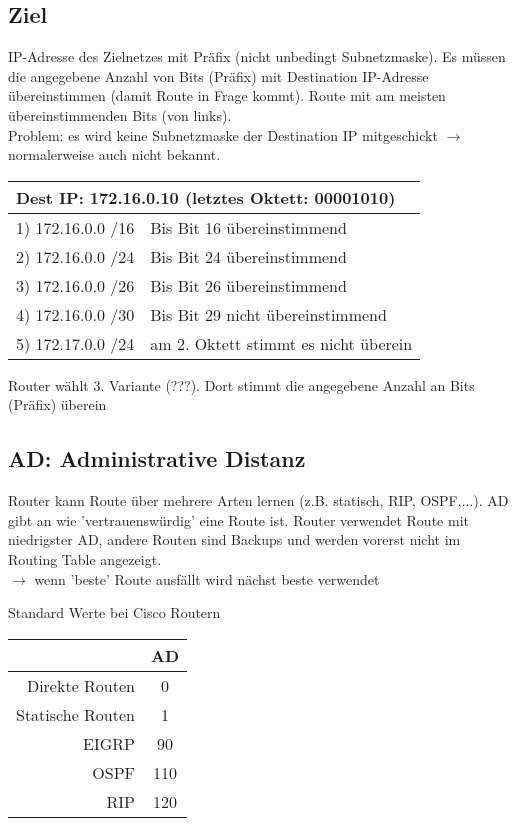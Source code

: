 \subsection*{Ziel}
IP-Adresse des Zielnetzes mit Präfix (nicht unbedingt Subnetzmaske). Es müssen die angegebene Anzahl von Bits (Präfix) mit Destination IP-Adresse übereinstimmen (damit Route in Frage kommt). Route mit am meisten übereinstimmenden Bits (von links). \\
Problem: es wird keine Subnetzmaske der Destination IP mitgeschickt $\rightarrow$ normalerweise auch nicht bekannt.

\begin{center}
\begin{tabular}{ll}
	\multicolumn{2}{l}{Dest IP: 172.16.0.10 (letztes Oktett: 00001010)} \\
	\hline
	1) 172.16.0.0 /16 & Bis Bit 16 übereinstimmend \\
	2) 172.16.0.0 /24 & Bis Bit 24 übereinstimmend \\
	3) 172.16.0.0 /26 & Bis Bit 26 übereinstimmend \\
	4) 172.16.0.0 /30 & Bis Bit 29 nicht übereinstimmend \\
	5) 172.17.0.0 /24 & am 2. Oktett stimmt es nicht überein
\end{tabular}
\end{center}

Router wählt 3. Variante (???). Dort stimmt die angegebene Anzahl an Bits (Präfix) überein

\subsection*{AD: Administrative Distanz}
Router kann Route über mehrere Arten lernen (z.B. statisch, RIP, OSPF,...). AD gibt an wie 'vertrauenswürdig' eine Route ist. Router verwendet Route mit niedrigster AD, andere Routen sind Backups und werden vorerst nicht im Routing Table angezeigt.\\
$\rightarrow$ wenn 'beste' Route ausfällt wird nächst beste verwendet

Standard Werte bei Cisco Routern
\begin{table}[H]
	\begin{tabular}{rc}
		& AD \\
		\hline
		Direkte Routen & 0 \\
		Statische Routen & 1 \\
		EIGRP & 90 \\
		OSPF & 110 \\
		RIP & 120 \\
	\end{tabular}
\end{table}

